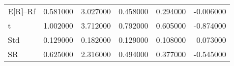 \begin{tabular}{lrrrrr}
\toprule
\midrule
E[R]--Rf & 0.581000 & 3.027000 & 0.458000 & 0.294000 & -0.006000 \\
t & 1.002000 & 3.712000 & 0.792000 & 0.605000 & -0.874000 \\
Std & 0.129000 & 0.182000 & 0.129000 & 0.108000 & 0.073000 \\
SR & 0.625000 & 2.316000 & 0.494000 & 0.377000 & -0.545000 \\
\bottomrule
\end{tabular}
